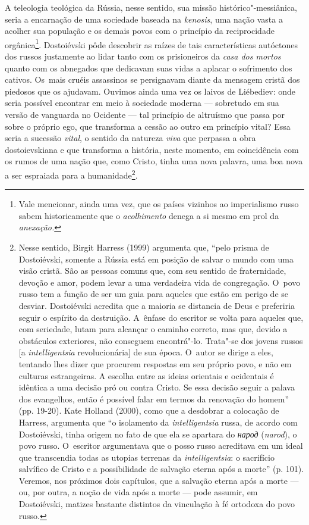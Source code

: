 A teleologia teológica da Rússia, nesse sentido, sua missão
histórico"-messiânica, seria a encarnação de uma sociedade baseada na
\emph{kenosis}, uma nação vasta a acolher sua população e os demais
povos com o princípio da reciprocidade orgânica\footnote{Vale mencionar,
  ainda uma vez, que os países vizinhos ao imperialismo russo sabem
  historicamente que o \emph{acolhimento} denega a si mesmo em prol da
  \emph{anexação. }}. Dostoiévski pôde descobrir as raízes de tais
características autóctones dos russos justamente ao lidar tanto com os
prisioneiros da \emph{casa dos mortos} quanto com os abnegados que
dedicavam suas vidas a aplacar o sofrimento dos cativos. Os~mais cruéis
assassinos se persignavam diante da mensagem cristã dos piedosos que os
ajudavam. Ouvimos ainda uma vez os laivos de Liébediev: onde seria
possível encontrar em meio à sociedade moderna --- sobretudo em sua
versão de vanguarda no Ocidente --- tal princípio de altruísmo que passa
por sobre o próprio ego, que transforma a cessão ao outro em princípio
vital? Essa seria a sucessão \emph{vital}, o sentido da natureza
\emph{viva} que perpassa a obra dostoievskiana e que transforma a
história, neste momento, em coincidência com os rumos de uma nação que,
como Cristo, tinha uma nova palavra, uma boa nova a ser espraiada para a
humanidade\footnote{Nesse sentido, Birgit Harress (1999) argumenta que,
  ``pelo prisma de Dostoiévski, somente a Rússia está em posição de
  salvar o mundo com uma visão cristã. São as pessoas comuns que, com
  seu sentido de fraternidade, devoção e amor, podem levar a uma
  verdadeira vida de congregação. O~povo russo tem a função de ser um
  guia para aqueles que estão em perigo de se desviar. Dostoiévski
  acredita que a maioria se distancia de Deus e preferiria seguir o
  espírito da destruição. A~ênfase do escritor se volta para aqueles
  que, com seriedade, lutam para alcançar o caminho correto, mas que,
  devido a obstáculos exteriores, não conseguem encontrá"-lo. Trata"-se
  dos jovens russos [a \emph{intelligentsia} revolucionária] de sua
  época. O~autor se dirige a eles, tentando lhes dizer que procurem
  respostas em seu próprio povo, e não em culturas estrangeiras. A
  escolha entre as ideias orientais e ocidentais é idêntica a uma
  decisão pró ou contra Cristo. Se essa decisão seguir a palava dos
  evangelhos, então é possível falar em termos da renovação do homem''
  (pp. 19-20). Kate Holland (2000), como que a desdobrar a colocação de
  Harress, argumenta que ``o isolamento da \emph{intelligentsia} russa,
  de acordo com Dostoiévski, tinha origem no fato de que ela se apartara
  do \emph{народ}
  (\emph{narod}), o povo russo. O~escritor argumentava que o posso russo
  acreditava em um ideal que transcendia todas as utopias terrenas da
  \emph{intelligentsia}: o sacrifício salvífico de Cristo e a
  possibilidade de salvação eterna após a morte'' (p. 101). Veremos, nos
  próximos dois capítulos, que a salvação eterna após a morte --- ou, por
  outra, a noção de vida após a morte --- pode assumir, em Dostoiévski,
  matizes bastante distintos da vinculação à fé ortodoxa do povo russo.}.
